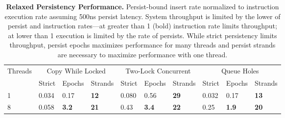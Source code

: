 \begin{table*}
  \centering
  \begin{tabular}{ l l l l l l l l l l }
    \hline
    Threads & \multicolumn{3}{c}{Copy While Locked} & \multicolumn{3}{c}{Two-Lock Concurrent} & \multicolumn{3}{c}{Queue Holes} \\
    & Strict & Epochs & Strands & Strict & Epochs & Strands & Strict & Epochs & Strands \\
    \hline \hline
    1 & 0.034 & 0.17 & \textbf{12} & 0.080 & 0.56 & \textbf{29} & 0.032 & 0.17 & \textbf{13} \\
    8 & 0.058 & \textbf{3.2} & \textbf{21} & 0.43 & \textbf{3.4} & \textbf{22} & 0.25 & \textbf{1.9} & \textbf{20} \\
    \hline
  \end{tabular}
  \caption{
    \textbf{Relaxed Persistency Performance.}
    Persist-bound insert rate normalized to instruction execution rate assuming 500ns persist latency.
    System throughput is limited by the lower of persist and instruction rates---at greater than 1 (bold) instruction rate limits throughput; at lower than 1 execution is limited by the rate of persists.
    While strict persistency limits throughput, persist epochs maximizes performance for many threads and persist strands are necessary to maximize performance with one thread.
  }
  \label{table::RelaxedPerformance}
\end{table*}
